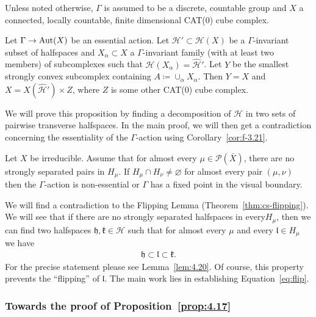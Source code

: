 Unless noted otherwise, \(\Gamma\) is assumed to be a discrete, countable group and \(X\) a connected, locally countable, finite dimensional CAT(0) cube complex.

\begin{prop}[{\cite[Proposition~4.17]{MR3509968}}]
  \label{prop:4.17}
  Let \(\Gamma \to \operatorname{Aut}(X)\) be an essential action. Let \(\mathcal{H}' \subset \mathcal{H}(X)\) be a \(\Gamma\)-invariant subset of halfspaces and \(X_\alpha \subset X\) a \(\Gamma\)-invariant family (with at least two members) of subcomplexes such that \(\mathcal{\hat H}(X_\alpha) = \mathcal{\hat H}'\). Let \(Y\) be the smallest strongly convex subcomplex containing \(A \coloneqq \cup_\alpha X_\alpha\). Then \(Y = X\) and \(X = X(\mathcal{\hat H}') \times Z\), where \(Z\) is some other CAT(0) cube complex.
\end{prop}

We will prove this proposition by finding a decomposition of \(\mathcal{H}\) in two sets of pairwise transverse halfspaces. In the main proof, we will then get a contradiction concerning the essentiality of the \(\Gamma\)-action using Corollary~\ref{cor:f-3.21}.

\begin{prop}[{\cite[Corollary~4.21]{MR3509968}}]
  \label{prop:4.21}
  Let \(X\) be irreducible. Assume that for almost every \(\mu \in \mathcal{P}(\bar X)\), there are no strongly separated pairs in \(H_\mu\). If \(H_\mu \cap H_\nu \neq \varnothing\) for almost every pair \((\mu, \nu)\) then the \(\Gamma\)-action is non-essential or \(\Gamma\) has a fixed point in the visual boundary.
\end{prop}

We will find a contradiction to the Flipping Lemma (Theorem~\ref{thm:cs-flipping}). We will see that if there are no strongly separated halfspaces in every\(H_\mu\), then we can find two halfspaces \(\mathfrak{h}, \mathfrak{k} \in \mathcal{H}\) such that for almost every \(\mu\) and every \(\mathfrak{l} \in H_\mu\) we have
\begin{align}
  \mathfrak{h} \subset \mathfrak{l} \subset \mathfrak{k}.\label{eq:flip}
\end{align}
For the precise statement please see Lemma~\ref{lem:4.20}. Of course, this property prevents the \enquote{flipping} of \(\mathfrak{l}\). The main work lies in establishing Equation~\eqref{eq:flip}.

\subsubsection*{Towards the proof of Proposition~\ref{prop:4.17}}

